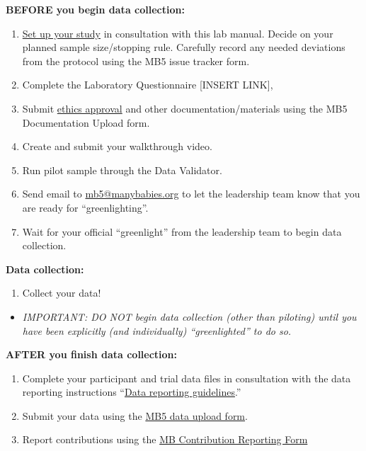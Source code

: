 \documentclass[
]{book}
\providecommand{\tightlist}{%
  \setlength{\itemsep}{0pt}\setlength{\parskip}{0pt}}
\begin{document}
\textbf{BEFORE you begin data collection:}

\begin{enumerate}
\def\labelenumi{\arabic{enumi}.}
\setcounter{enumi}{3}
\tightlist
\item
  \hyperref[setting-up-the-experiment]{Set up your study} in consultation with this lab manual. Decide on your planned sample size/stopping rule. Carefully record any needed deviations from the protocol using the MB5 issue tracker form.
\item
  Complete the Laboratory Questionnaire {[}INSERT LINK{]},
\item
  Submit \hyperref[ethics-approval]{ethics approval} and other documentation/materials using the MB5 Documentation Upload form.
\item
  Create and submit your walkthrough video.
\item
  Run pilot sample through the Data Validator.
\item
  Send email to \url{mb5@manybabies.org} to let the leadership team know that you are ready for ``greenlighting''.
\item
  Wait for your official ``greenlight'' from the leadership team to begin data collection.
\end{enumerate}

\textbf{Data collection:}

\begin{enumerate}
\def\labelenumi{\arabic{enumi}.}
\setcounter{enumi}{10}
\tightlist
\item
  Collect your data!
\end{enumerate}

\begin{itemize}
\tightlist
\item
  \emph{IMPORTANT: DO NOT begin data collection (other than piloting) until you have been explicitly (and individually) ``greenlighted'' to do so.}
\end{itemize}

\textbf{AFTER you finish data collection:}

\begin{enumerate}
\def\labelenumi{\arabic{enumi}.}
\setcounter{enumi}{11}
\tightlist
\item
  Complete your participant and trial data files in consultation with the data reporting instructions ``\hyperref[data-reporting-guidelines]{Data reporting guidelines}.''
\item
  Submit your data using the \href{https://docs.google.com/forms/d/e/1FAIpQLSdFYk-gb4yjRYLjSTP1_BVaW-3vLkpJClLoY2BOGDGfIVE5ww/viewform?usp=sf_link}{MB5 data upload form}.
\item
  Report contributions using the \href{https://manybabies.org/credit/}{MB Contribution Reporting Form}
\end{enumerate}
\end{document}
